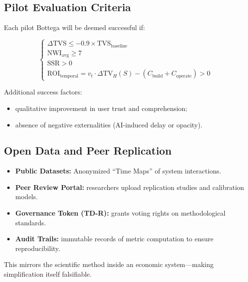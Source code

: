 \subsection{Pilot Evaluation Criteria}
\label{sec:pilot-criteria}

Each pilot Bottega will be deemed successful if:

\begin{equation}
\label{eq:pilot-success}
\begin{cases}
\Delta \text{TVS} \le -0.9 \times \text{TVS}_{\text{baseline}} \\
\text{NWI}_{\text{avg}} \ge 7 \\
\text{SSR} > 0 \\
\text{ROI}_{\text{temporal}} = v_t \cdot \Delta \text{TV}_H(S) - (C_{\text{build}} + C_{\text{operate}}) > 0
\end{cases}
\end{equation}

Additional success factors:
\begin{itemize}
    \item qualitative improvement in user trust and comprehension;
    \item absence of negative externalities (AI-induced delay or opacity).
\end{itemize}

\subsection{Open Data and Peer Replication}
\label{sec:open-data}

\begin{itemize}
    \item \textbf{Public Datasets:} Anonymized ``Time Maps'' of system interactions.
    \item \textbf{Peer Review Portal:} researchers upload replication studies and calibration models.
    \item \textbf{Governance Token (TD-R):} grants voting rights on methodological standards.
    \item \textbf{Audit Trails:} immutable records of metric computation to ensure reproducibility.
\end{itemize}

This mirrors the scientific method inside an economic system—making simplification itself falsifiable.

